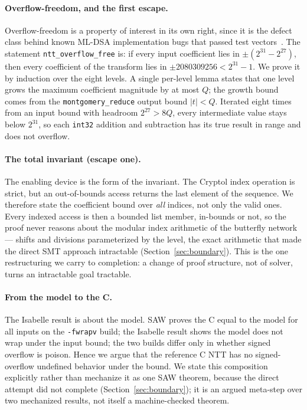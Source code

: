 \documentclass[journal=tches,submission,review]{iacrtrans}
\newcommand{\code}[1]{\texttt{#1}}
\begin{document}
\paragraph{Overflow-freedom, and the first escape.} Overflow-freedom is a property of interest in its own
right, since it is the defect class behind known ML-DSA
implementation bugs that passed test vectors~\cite{eprint1032}. The statement \code{ntt\_overflow\_free}
is: if every input coefficient lies in $\pm(2^{31} - 2^{27})$, then every coefficient of the transform
lies in $\pm 2080309256 < 2^{31} - 1$. We prove it by induction over the eight levels. A single per-level
lemma states that one level grows the maximum coefficient magnitude by at most $Q$; the growth bound
comes from the \code{montgomery\_reduce} output bound $|t| < Q$. Iterated eight times from an input bound
with headroom $2^{27} > 8Q$, every intermediate value stays below $2^{31}$, so each \code{int32}
addition and subtraction has its true result in range and does not overflow.

\paragraph{The total invariant (escape one).} The enabling device is the form of the invariant. The
Cryptol index operation is strict, but an out-of-bounds access returns the last element of the sequence.
We therefore state the coefficient bound over \emph{all} indices, not only the valid ones. Every indexed
access is then a bounded list member, in-bounds or not, so the proof never reasons about the modular
index arithmetic of the butterfly network --- shifts and divisions parameterized by the level, the exact
arithmetic that made the direct SMT approach intractable (Section~\ref{sec:boundary}). This is the one
restructuring we carry to completion: a change of proof structure, not of solver, turns an intractable
goal tractable.

\paragraph{From the model to the C.} The Isabelle result is about the model. SAW proves the C equal to
the model for all inputs on the \code{-fwrapv} build; the Isabelle result shows the model does not wrap
under the input bound; the two builds differ only in whether signed overflow is poison. Hence we argue that the
reference C NTT has no signed-overflow undefined behavior under the bound. We state this composition
explicitly rather than mechanize it as one SAW theorem, because the direct attempt did not complete
(Section~\ref{sec:boundary}); it is an argued meta-step over two mechanized results, not itself a machine-checked theorem.
\end{document}
